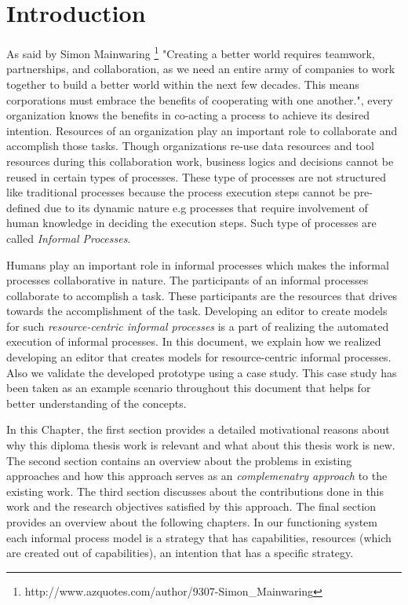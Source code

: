 \chapter{Introduction}
\label{chap:introduction}

As said by Simon Mainwaring  \footnote{http://www.azquotes.com/author/9307-Simon\_Mainwaring}  "Creating a better world requires teamwork, partnerships, and collaboration, as we need an entire army of companies to work together to build a better world within the next few decades. This means corporations must embrace the benefits of cooperating with one another.", every organization knows the benefits in co-acting a process to achieve its desired intention. Resources of an organization play an important role to collaborate and accomplish those tasks. Though organizations re-use data resources and tool resources during this collaboration work, business logics and decisions cannot be reused in certain types of processes. These type of processes are not structured like traditional processes because the process execution steps cannot be pre-defined due to its dynamic nature e.g processes that require involvement of human knowledge in deciding the execution steps\cite{Sungur2014}. Such type of processes are called \textit{Informal Processes}.

Humans play an important role in informal processes which makes the informal processes collaborative in nature. The participants of an informal processes collaborate to accomplish a task. These participants are the resources that drives towards the accomplishment of the task.  Developing an editor to create models for such \textit{resource-centric informal processes} is a part of realizing the automated execution of informal processes. In this document, we explain how we realized developing an editor that creates models for resource-centric informal processes. Also we validate the developed prototype using a case study. This case study has been taken as an example scenario throughout this document that helps for better understanding of the concepts.

In this Chapter, the first section provides a detailed motivational reasons about why this diploma thesis work is relevant and what about this thesis work is new.  The second section contains an overview about the problems in existing approaches and how this approach serves as an \textit{complemenatry approach} to the existing work. The third section discusses about the contributions done in this work  and the research objectives satisfied by this approach. The final section provides an overview about the following chapters. In our functioning system each informal process model is a strategy that has capabilities, resources (which are created out of capabilities), an intention that has a specific strategy. 

